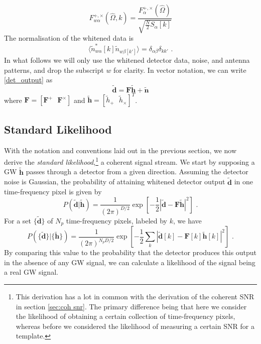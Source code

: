 \documentclass[11pt]{cuthesis}
\newcommand{\fs}{\text{ .}}
\newcommand{\tbd}{\tilde{\textbf{d}}}
\newcommand{\tbh}{\tilde{\textbf{h}}}
\begin{document}
\begin{equation}
F^{+,\times}_{w\alpha}(\hat{\Omega},k)=\frac{F^{+,\times}_\alpha (\hat{\Omega})}{\sqrt{\frac{N}{2}S_\alpha [k]}}
\end{equation}
The normalisation of the whitened data is 
\begin{equation}
\langle  \tilde{n}^*_{w\alpha} [k] \tilde{n}_{w\beta [k']}  \rangle = \delta _{\alpha \beta} \delta _{k k'}  \fs
\end{equation}
In what follows we will only use the whitened detector data, noise, and antenna patterns, and drop the subscript $w$ for clarity. In vector notation, we can write \ref{det_output} as
\begin{equation}
\tilde{\textbf{d}}=\textbf{F}\tilde{\textbf{h}}+\tilde{\textbf{n}} 
\end{equation}
where $\textbf{F}=[\textbf{F}^+ \:\:\:\textbf{F}^\times]$ and $\tilde{\textbf{h}}=[\tilde{h}_+ \:\:\: \tilde{h}_\times]^T$.

\subsection{Standard Likelihood}
With the notation and conventions laid out in the previous section, we now derive the \textit{standard likelihood},\footnote{This derivation has a lot in common with the derivation of the coherent SNR in section \ref{sec:coh snr}. The primary difference being that here we consider the likelihood of obtaining a certain collection of time-frequency pixels, whereas before we considered the likelihood of measuring a certain SNR for a template.} a coherent signal stream. We start by supposing a GW $\tilde{\textbf{h}}$ passes through a detector from a given direction. Assuming the detector noise is Gaussian, the probability of attaining whitened detector output $\tilde{\textbf{d}}$ in one time-frequency pixel is given by
\begin{equation}
P(\tilde{\textbf{d}}|\tilde{\textbf{h}})=\frac{1}{(2\pi )^{D/2}}\exp \left[ -\frac{1}{2} \left| \tbd - \textbf{F} \tbh  \right|^2 \right] \fs
\end{equation}  
For a set $\{ \tbd \}$ of $N_p$ time-frequency pixels, labeled by $k$, we have
\begin{equation}
P(\{ \tilde{\textbf{d}} \}|\{ \tilde{\textbf{h}} \})=\frac{1}{(2\pi )^{N_p D/2}}\exp \left[- \frac{1}{2} \sum_k \left| \tbd [k] - \textbf{F}[k] \tbh [k]  \right|^2 \right] \fs
\end{equation}  
By comparing this value to the probability that the detector produces this output in the absence of any GW signal, we can calculate a likelihood of the signal being a real GW signal. 
\end{document}
